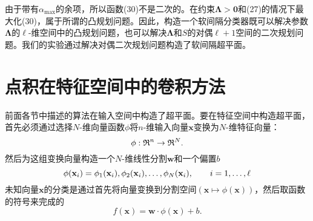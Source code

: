 \documentclass[lang=cn,11pt,a4paper]{elegantpaper}
\begin{document}
	由于带有$\alpha_\mathrm{max}$的余项，所以函数(30)不是二次的。在约束$\mathbf{\Lambda}>\mathbf{0}$和(27)的情况下最大化(30)，属于所谓的凸规划问题。因此，构造一个软间隔分类器既可以解决参数$\mathbf{\Lambda}$的$\ell$-维空间中的凸规划问题，也可以解决$\mathbf{\Lambda}$和$S$的对偶$\ell+1$空间的二次规划问题。我们的实验通过解决对偶二次规划问题构造了软间隔超平面。

	\section{点积在特征空间中的卷积方法}
	前面各节中描述的算法在输入空间中构造了超平面。要在特征空间中构造超平面，首先必须通过选择$N$-维向量函数$\phi$将$n$-维输入向量$\mathbf{x}$变换为$N$-维特征向量：
	\begin{equation}
		\phi:\mathfrak{R}^n\to\mathfrak{R}^N.\notag
	\end{equation}
	然后为这组变换向量构造一个$N$-维线性分割$\mathbf{w}$和一个偏置$b$
	\begin{equation}
		\phi(\mathbf{x}_i)=\phi_1(\mathbf{x}_i),\phi_2(\mathbf{x}_i),\dots,\phi_N(\mathbf{x}_i),\qquad i=1,\dots,\ell\notag
	\end{equation}
	未知向量$\mathbf{x}$的分类是通过首先将向量变换到分割空间$(\mathbf{x}\mapsto\phi(\mathbf{x}))$，然后取函数的符号来完成的
	\begin{equation}
		f(\mathbf{x})=\mathbf{w}·\phi(\mathbf{x})+b.\tag{31}
	\end{equation}
\end{document}
